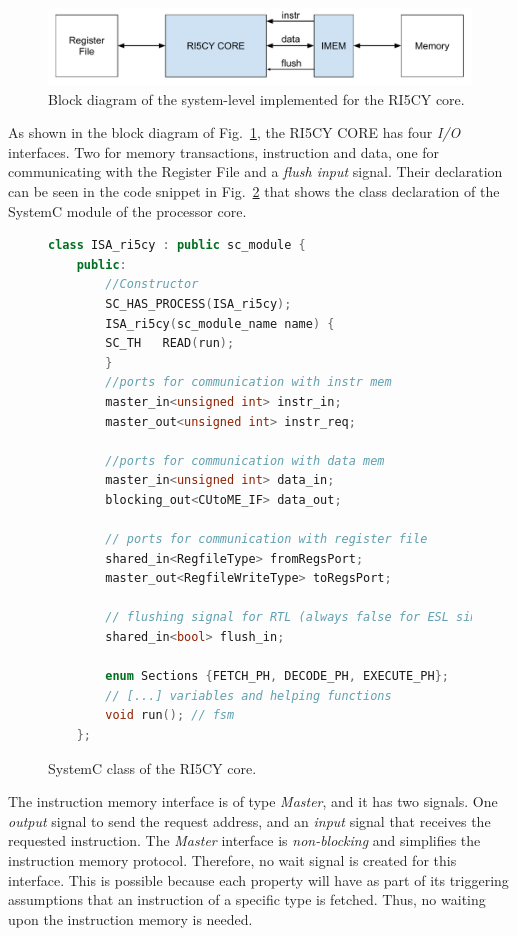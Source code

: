 \begin{figure}[htb!]
	\centering
	\includegraphics[width=\textwidth]{images/sim-block-diagram.pdf}
	\caption{Block diagram of the system-level implemented for the RI5CY core.}
	\label{fig:sim-ri5cy-diagram}
\end{figure}

As shown in the block diagram of Fig.~\ref{fig:sim-ri5cy-diagram}, the RI5CY CORE has four \textit{I/O} interfaces. Two for memory transactions, instruction and data, one for communicating with the Register File and a \textit{flush input} signal. Their declaration can be seen in the code snippet in Fig.~\ref{fig:ri5cy-sc-module} that shows the class declaration of the SystemC module of the processor core.

\begin{figure}[htb!]
    \begin{lstlisting}[language=c++]
    class ISA_ri5cy : public sc_module {
    public:
        //Constructor
        SC_HAS_PROCESS(ISA_ri5cy);
        ISA_ri5cy(sc_module_name name) {
        SC_TH   READ(run);
        }
        //ports for communication with instr mem
        master_in<unsigned int> instr_in;
        master_out<unsigned int> instr_req;
        
        //ports for communication with data mem
        master_in<unsigned int> data_in;
        blocking_out<CUtoME_IF> data_out;
        
        // ports for communication with register file
        shared_in<RegfileType> fromRegsPort;
        master_out<RegfileWriteType> toRegsPort;
        
        // flushing signal for RTL (always false for ESL simulation)
        shared_in<bool> flush_in;
        
        enum Sections {FETCH_PH, DECODE_PH, EXECUTE_PH};
        // [...] variables and helping functions
        void run(); // fsm
    };\end{lstlisting}
    \caption{SystemC class of the RI5CY core.}
    \label{fig:ri5cy-sc-module}
\end{figure}

The instruction memory interface is of type \textit{Master}, and it has two signals. One \textit{output} signal to send the request address, and an \textit{input} signal that receives the requested instruction. The \textit{Master} interface is \textit{non-blocking} and simplifies the instruction memory protocol. Therefore, no wait signal is created for this interface. This is possible because each property will have as part of its triggering assumptions that an instruction of a specific type is fetched. Thus, no waiting upon the instruction memory is needed.

